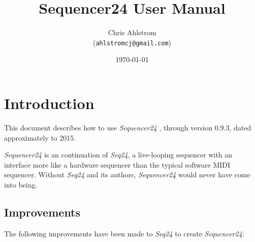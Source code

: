 \documentclass[
 11pt,
 twoside,
 a4paper,
 headinclude,
 footinclude,
 final                                 %
]{article}
\begin{document}
\title{Sequencer24 User Manual}
\author{Chris Ahlstrom\\
   (\texttt{ahlstromcj@gmail.com})}
\date{\today}
\maketitle
\tableofcontents
\listoffigures                         %


\setlength{\parindent}{0pt}
\setlength{\parskip}{1ex plus 0.5ex minus 0.2ex}

\section{Introduction}
\label{sec:introduction}

   This document describes how to use \textsl{Sequencer24} \cite{seq24},
   through version 0.9.3, dated approximately to 2015.

   \textsl{Sequencer24} is an continuation of \textsl{Seq24},
   a live-looping sequencer with an interface more like a hardware sequencer
   than the typical software MIDI sequencer.  Without \textsl{Seq24} and its
   authors, \textsl{Sequencer24} would never have come into being.

\subsection{Improvements}
\label{subsec:improvements}

   The following improvements have been made to \textsl{Seq24} to
   create \textsl{Sequencer24}:
\end{document}
